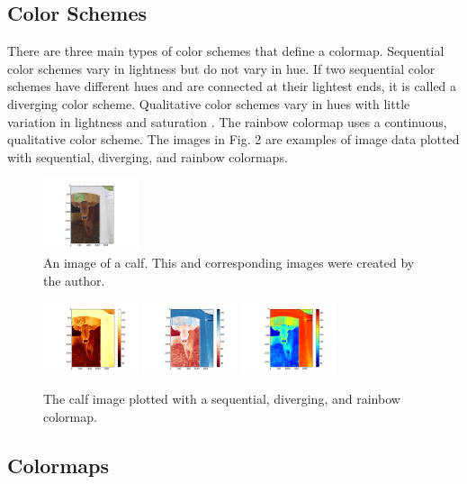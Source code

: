 \documentclass[journal]{IEEEtran}
\begin{document}
\subsection{Color Schemes}

There are three main types of color schemes that define a colormap.
Sequential color schemes vary in lightness but do not
vary in hue. If two sequential color schemes have different hues and are
connected at their lightest ends, it is called a diverging color scheme. Qualitative color
schemes vary in hues with little variation in lightness
and saturation \cite{colormapping}. The rainbow colormap uses a continuous,
qualitative color scheme. The images in Fig. 2
are examples of image data plotted with 
sequential, diverging, and rainbow colormaps.

\begin{figure}[H]
\centering
\includegraphics[width=1.1in]{calf_original}%
\caption{An image of a calf. This and corresponding images were created by the author.}
\end{figure}

\begin{figure}[H]
\includegraphics[width=1.1in]{calf_sequential}%
\hfil
\includegraphics[width=1.1in]{calf_diverging}%
\hfil
\includegraphics[width=1.1in]{calf_rainbow}%
\caption{The calf image plotted with a
sequential, diverging, and rainbow colormap.}
\end{figure}

\subsection{Colormaps}
\end{document}
